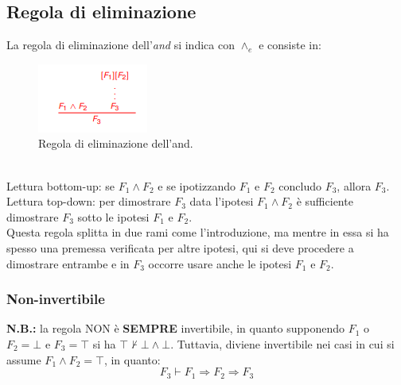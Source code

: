 \documentclass[12pt]{article}
\begin{document}
\subsection{Regola di eliminazione}
\label{ssec:and_elim}
La regola di eliminazione dell'\textit{and} si indica con $\wedge_e$ e consiste in:
\begin{figure}[!htb]
    \centering
    \includegraphics[width=.9\linewidth,height=.40\textheight,keepaspectratio]{logica_proposizionale/introduzione/eliminazione_and.png} %
    \begin{center}
        \caption{\label{fig:eliminazione_and}Regola di eliminazione dell'and.} %
    \end{center}
\end{figure}\\
Lettura bottom-up: se $F_1 \wedge F_2$ e se ipotizzando $F_1$ e $F_2$ concludo $F_3$, allora $F_3$.\\
Lettura top-down: per dimostrare $F_3$ data l'ipotesi $F_1 \wedge F_2$ è sufficiente dimostrare $F_3$ sotto le ipotesi $F_1$ e $F_2$.\\
Questa regola splitta in due rami come l'introduzione, ma mentre in essa si ha spesso una premessa verificata per altre ipotesi, qui si deve procedere a dimostrare entrambe e in $F_3$ occorre usare anche le ipotesi $F_1$ e $F_2$.

\subsubsection{Non-invertibile}
\label{sssec:and_non_inv}
\textbf{N.B.:} la regola NON è \textbf{SEMPRE} invertibile, in quanto supponendo $F_1$ o $F_2 = \bot$ e $F_3 = \top$ si ha $\top \not\vdash \bot \wedge \bot$.
Tuttavia, diviene invertibile nei casi in cui si assume $F_1 \wedge F_2 = \top$, in quanto:
\[F_3 \vdash F_1 \Rightarrow F_2 \Rightarrow F_3\]
\end{document}
